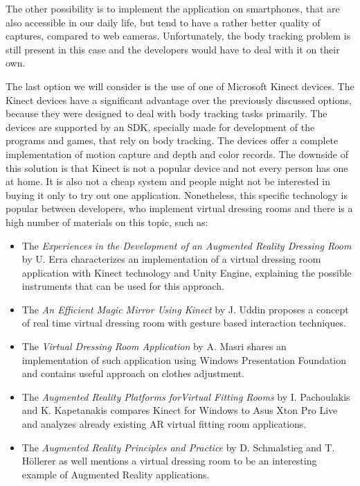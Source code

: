 \documentclass[a4paper]{report}
\begin{document}
The other possibility is to implement the application on smartphones, that are also accessible in our daily life, but tend to have a rather better quality of captures, compared to web cameras. Unfortunately, the body tracking problem is still present in this case and the developers would have to deal with it on their own.

The last option we will consider is the use of one of Microsoft Kinect devices. The Kinect devices have a significant advantage over the previously discussed options, because they were designed to deal with body tracking tasks primarily. The devices are supported by an SDK, specially made for development of the programs and games, that rely on body tracking. The devices offer a complete implementation of motion capture and depth and color records. The downside of this solution is that Kinect is not a popular device and not every person has one at home. It is also not a cheap system and people might not be interested in buying it only to try out one application. Nonetheless, this specific technology is popular between developers, who implement virtual dressing rooms and there is a high number of materials on this topic, such as:

\begin{itemize}
   
    
    \item The \textit{Experiences in the Development of an Augmented Reality Dressing Room} by U. Erra \cite{VFR_experiences_AU_Unity} characterizes an implementation of a virtual dressing room application with Kinect technology and Unity Engine, explaining the possible instruments that can be used for this approach.
    
    \item The \textit{An Efficient Magic Mirror Using Kinect} by J. Uddin \cite{VFR_efficient_magic_mirror} proposes a concept of real time virtual dressing room with gesture based interaction techniques.
    
    \item The \textit{Virtual Dressing Room Application} by A. Masri \cite{vfrApp} shares an implementation of such application using Windows Presentation Foundation and contains useful approach on clothes adjustment.
    
    \item The \textit{Augmented  Reality  Platforms  forVirtual  Fitting  Rooms} by  I.  Pachoulakis  and  K.  Kapetanakis \cite{auFittingRooms} compares Kinect for Windows to Asus Xton Pro Live and analyzes already existing AR virtual fitting room applications.


    \item The \textit{Augmented Reality Principles and Practice} by D. Schmalstieg and T. Höllerer \cite{ARpp} as well mentions a virtual dressing room to be an interesting example of Augmented Reality applications.
\end{itemize}
\end{document}
